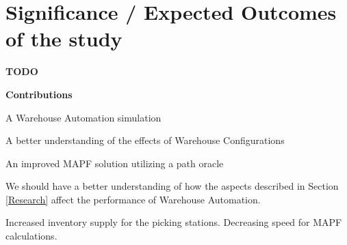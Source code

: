 \documentclass[a4paper,11pt]{article}
\begin{document}
\section{Significance / Expected Outcomes of the study}

\textbf{TODO}


\noindent \textbf{Contributions}
\begin{compactitem}
	\item A Warehouse Automation simulation
	\item A better understanding of the effects of Warehouse Configurations
	\item An improved MAPF solution utilizing a path oracle
\end{compactitem}


We should have a better understanding of how the aspects described in Section \ref{Research} affect the performance of Warehouse Automation.

Increased inventory supply for the picking stations. Decreasing speed for MAPF calculations.





\end{document}
